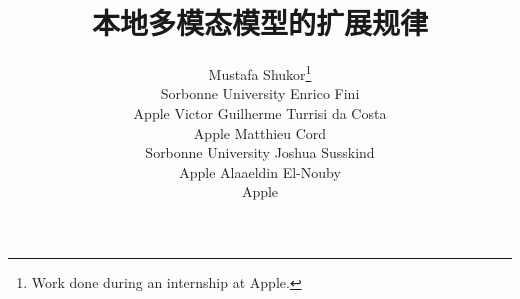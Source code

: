 \documentclass[10pt,letterpaper]{article}
\title{本地多模态模型的扩展规律}
\author{
    Mustafa Shukor\thanks{Work done during an internship at Apple.} \\
    Sorbonne University
    \And
    Enrico Fini \\
    Apple
    \And
    Victor Guilherme Turrisi da Costa \\
    Apple
    \And
    Matthieu Cord \\
    Sorbonne University
    \And
    Joshua Susskind \\
    Apple
    \And
    Alaaeldin El-Nouby \\
    Apple
}
\begin{document}
\begin{CJK*}{UTF8}{gbsn}
\setcounter{tocdepth}{2}
\doparttoc
\renewcommand\ptctitle{}
\faketableofcontents

\maketitle







{
    \small
    
    
}
\clearpage
\appendix
{}
\renewcommand\ptctitle{Appendices}
\part{}
\parttoc
\clearpage


\end{CJK*}
\end{document}
